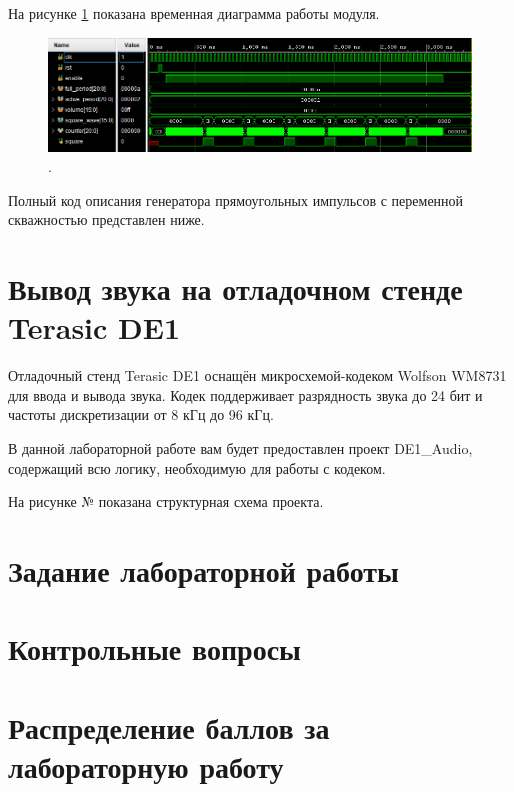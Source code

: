 На рисунке \ref{lab7:pic6} показана временная диаграмма работы модуля.

\begin{figure}[H]
	\centering
	\includegraphics [width=1\textwidth] {images/lab_7/square_simulate2.PNG}
	\caption{.}
	\label{lab7:pic6}
\end{figure}

Полный код описания генератора прямоугольных импульсов с переменной скважностью представлен ниже.


\noindent
\begin{minipage}{\linewidth}
	
\end{minipage}



\section{Вывод звука на отладочном стенде Terasic DE1}

Отладочный стенд Terasic DE1 оснащён микросхемой-кодеком Wolfson WM8731 для ввода и вывода звука. Кодек поддерживает разрядность звука до 24 бит и частоты дискретизации от 8 кГц до 96 кГц.


В данной лабораторной работе вам будет предоставлен проект DE1_Audio, содержащий всю логику, необходимую для работы с кодеком.

На рисунке № показана структурная схема проекта.

\section{Задание лабораторной работы}


\section{Контрольные вопросы}


\section{Распределение баллов за лабораторную работу}